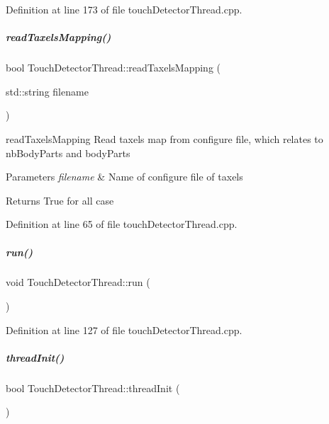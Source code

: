 Definition at line 173 of file touch\+Detector\+Thread.\+cpp.

\mbox{\label{group__touchDetector_a4f791998bc682a7c798acc52a955b893}} 
\subparagraph{\texorpdfstring{read\+Taxels\+Mapping()}{readTaxelsMapping()}}
{\footnotesize\ttfamily bool Touch\+Detector\+Thread\+::read\+Taxels\+Mapping (\begin{DoxyParamCaption}\item[{std\+::string}]{filename }\end{DoxyParamCaption})\hspace{0.3cm}{\ttfamily [protected]}}



read\+Taxels\+Mapping Read taxels map from configure file, which relates to nb\+Body\+Parts and body\+Parts 


\begin{DoxyParams}{Parameters}
{\em filename} & Name of configure file of taxels \\
\hline
\end{DoxyParams}
\begin{DoxyReturn}{Returns}
True for all case 
\end{DoxyReturn}


Definition at line 65 of file touch\+Detector\+Thread.\+cpp.

\mbox{\label{group__touchDetector_a82ba0ba5951f718245a271e2a7689703}} 
\subparagraph{\texorpdfstring{run()}{run()}}
{\footnotesize\ttfamily void Touch\+Detector\+Thread\+::run (\begin{DoxyParamCaption}{ }\end{DoxyParamCaption})}



Definition at line 127 of file touch\+Detector\+Thread.\+cpp.

\mbox{\label{group__touchDetector_ae3198aedd09c06b63b68f98fe58cc382}} 
\subparagraph{\texorpdfstring{thread\+Init()}{threadInit()}}
{\footnotesize\ttfamily bool Touch\+Detector\+Thread\+::thread\+Init (\begin{DoxyParamCaption}{ }\end{DoxyParamCaption})}



